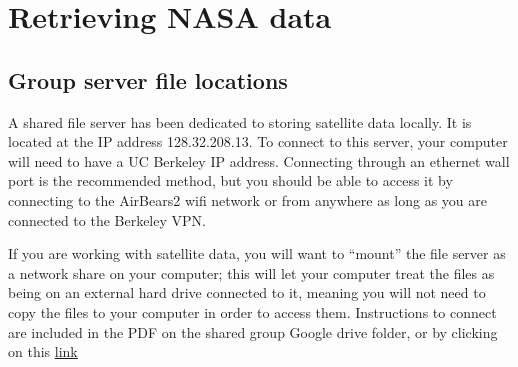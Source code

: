 \documentclass[12pt]{article}
\begin{document}
\section{Retrieving NASA data}
	\subsection{Group server file locations}\label{sec:file-server}
		A shared file server has been dedicated to storing satellite data locally. It is located at the IP address 128.32.208.13. To connect to this server, your computer will need to have a UC Berkeley IP address.  Connecting through an ethernet wall port is the recommended method, but you should be able to access it by connecting to the AirBears2 wifi network or from anywhere as long as you are connected to the Berkeley VPN.  
		
		If you are working with satellite data, you will want to ``mount'' the file server as a network share on your computer; this will let your computer treat the files as being on an external hard drive connected to it, meaning you will not need to copy the files to your computer in order to access them.  Instructions to connect are included in the PDF on the shared group Google drive folder, or by clicking on this \href{https://docs.google.com/a/berkeley.edu/document/d/1VQhAgULdtgVGKVtOlumQF3bH10mbaPXK5AKxML1_2s4/edit?usp=sharing}{link}
		
\end{document}
